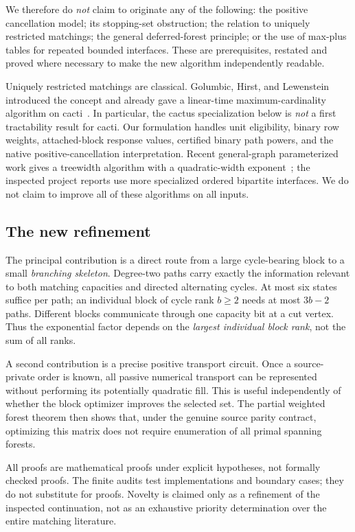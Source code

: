 \documentclass[11pt,letterpaper]{article}
\theoremstyle{definition}
\theoremstyle{remark}
\begin{document}
We therefore do \emph{not} claim to originate any of the following: the positive cancellation model; its stopping-set obstruction; the relation to uniquely restricted matchings; the general deferred-forest principle; or the use of max-plus tables for repeated bounded interfaces. These are prerequisites, restated and proved where necessary to make the new algorithm independently readable.

Uniquely restricted matchings are classical. Golumbic, Hirst, and Lewenstein introduced the concept and already gave a linear-time maximum-cardinality algorithm on cacti~\cite{ghl}. In particular, the cactus specialization below is \emph{not} a first tractability result for cacti. Our formulation handles unit eligibility, binary row weights, attached-block response values, certified binary path powers, and the native positive-cancellation interpretation. Recent general-graph parameterized work gives a treewidth algorithm with a quadratic-width exponent~\cite{csz}; the inspected project reports use more specialized ordered bipartite interfaces. We do not claim to improve all of these algorithms on all inputs.

\subsection{The new refinement}
The principal contribution is a direct route from a large cycle-bearing block to a small \emph{branching skeleton}. Degree-two paths carry exactly the information relevant to both matching capacities and directed alternating cycles. At most six states suffice per path; an individual block of cycle rank $b\ge2$ needs at most $3b-2$ paths. Different blocks communicate through one capacity bit at a cut vertex. Thus the exponential factor depends on the \emph{largest individual block rank}, not the sum of all ranks.

A second contribution is a precise positive transport circuit. Once a source-private order is known, all passive numerical transport can be represented without performing its potentially quadratic fill. This is useful independently of whether the block optimizer improves the selected set. The partial weighted forest theorem then shows that, under the genuine source parity contract, optimizing this matrix does not require enumeration of all primal spanning forests.

All proofs are mathematical proofs under explicit hypotheses, not formally checked proofs. The finite audits test implementations and boundary cases; they do not substitute for proofs. Novelty is claimed only as a refinement of the inspected continuation, not as an exhaustive priority determination over the entire matching literature.
\end{document}
